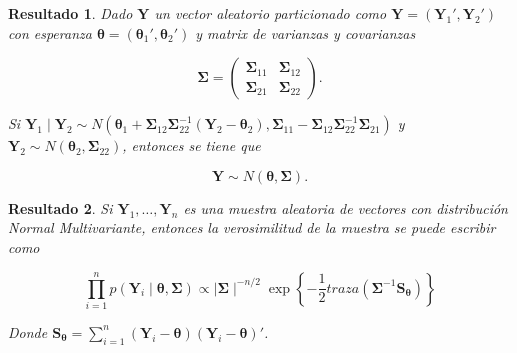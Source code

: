 \documentclass[
  10pt,
  spanish,
]{book}
\newtheorem{proposition}{Resultado}[chapter]
\theoremstyle{definition}
\theoremstyle{definition}
\theoremstyle{definition}
\theoremstyle{definition}
\theoremstyle{remark}
\begin{document}
\begin{proposition}
\protect\hypertarget{prp:unnamed-chunk-57}{}{\label{prp:unnamed-chunk-57} }Dado \(\mathbf{Y}\) un vector aleatorio particionado como \(\mathbf{Y}=(\mathbf{Y}_1',\mathbf{Y}_2')\) con esperanza \(\boldsymbol \theta=(\boldsymbol \theta_1',\boldsymbol \theta_2')\) y matrix de varianzas y covarianzas

\begin{equation*}
\boldsymbol \Sigma=\begin{pmatrix}
\boldsymbol \Sigma_{11}&\boldsymbol \Sigma_{12}\\
\boldsymbol \Sigma_{21}&\boldsymbol \Sigma_{22}
\end{pmatrix}.
\end{equation*}

Si \(\mathbf{Y}_1 \mid \mathbf{Y}_2\sim N(\boldsymbol \theta_1+\boldsymbol \Sigma_{12}\boldsymbol \Sigma_{22}^{-1}(\mathbf{Y}_2-\boldsymbol \theta_2),\boldsymbol \Sigma_{11}-\boldsymbol \Sigma_{12}\boldsymbol \Sigma_{22}^{-1}\boldsymbol \Sigma_{21})\) y \(\mathbf{Y}_2\sim N(\boldsymbol \theta_2,\boldsymbol \Sigma_{22})\), entonces se tiene que

\begin{equation*}
\mathbf{Y}\sim N(\boldsymbol \theta,\boldsymbol \Sigma).
\end{equation*}
\end{proposition}

\begin{proposition}
\protect\hypertarget{prp:unnamed-chunk-58}{}{\label{prp:unnamed-chunk-58} }Si \(\mathbf{Y}_1,\ldots,\mathbf{Y}_n\) es una muestra aleatoria de vectores con distribución Normal Multivariante, entonces la verosimilitud de la muestra se puede escribir como

\begin{equation}
\prod_{i=1}^np(\mathbf{Y}_i \mid \boldsymbol \theta,\boldsymbol \Sigma)\propto \mid \boldsymbol \Sigma\mid ^{-n/2}\exp\left\{-\frac{1}{2}traza(\boldsymbol \Sigma^{-1}\mathbf{S}_{\boldsymbol \theta})\right\}
\end{equation}

Donde \(\mathbf{S}_{\boldsymbol \theta}=\sum_{i=1}^n(\mathbf{Y}_i-\boldsymbol \theta)(\mathbf{Y}_i-\boldsymbol \theta)'\).
\end{proposition}
\end{document}
